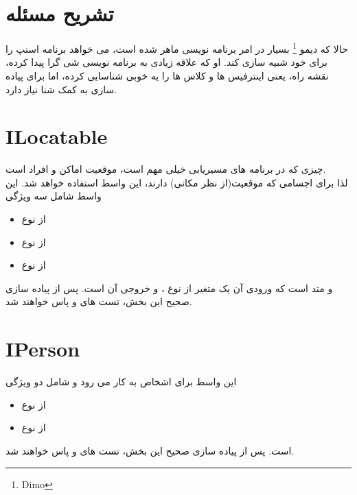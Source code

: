 \section{تشریح مسئله}
حالا که 
دیمو
\footnote{Dimo}
بسیار در امر برنامه نویسی ماهر شده است، می خواهد برنامه اسنپ را برای خود شبیه سازی کند.
او که علاقه زیادی به برنامه نویسی شی گرا پیدا کرده، نقشه راه، یعنی اینترفیس ها و کلاس ها را یه خوبی شناسایی کرده، اما برای پیاده سازی به کمک شنا نیاز دارد.
\\

    \section{ILocatable}
    چیزی که در برنامه های مسیریابی خیلی مهم است، موقعیت اماکن و افراد است. 
    \\
    لذا برای اجسامی که موقعیت(از نظر مکانی) دارند، این واسط استفاده خواهد شد.
    این واسط شامل سه ویژگی 
    \begin{itemize}
        \item {} از نوع 
            \grayBox{\textcolor{blue}{long}}
        \item {} از نوع 
            \grayBox{\textcolor{blue}{long}}
        \item {} از نوع 
            \grayBox{\textcolor{blue}{long}}
    \end{itemize}
    و متد
    است که ورودی آن یک متغیر از نوع  
    \grayBox{\textcolor{blue}{ILocatable}}
    ،
    و خروجی آن 
    \grayBox{\textcolor{blue}{long}}
    است.
    پس از پیاده سازی صحیح این بخش، تست های 
    \grayBox{\textcolor{dkgreen}{ILocatablePropertyTest}}
    و 
    \grayBox{\textcolor{dkgreen}{ILocatableMethodTest}}
    پاس خواهند شد.
    
    \section{IPerson}
    این واسط برای اشخاص به کار می رود و 
    شامل دو ویژگی 
    \begin{itemize}
        \item {} از نوع 
            \grayBox{\textcolor{blue}{string}}
        \item {} از نوع 
            \grayBox{\textcolor{blue}{string}}
    \end{itemize}
    است.
    پس از پیاده سازی صحیح این بخش، تست های 
    \grayBox{\textcolor{dkgreen}{IPersonPropertyTest}}
    و
    پاس خواهند شد.
    
